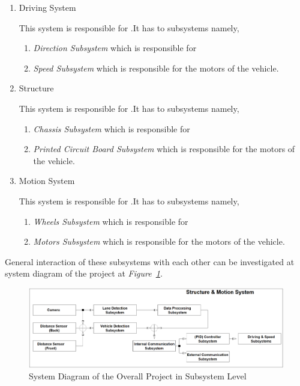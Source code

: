 \documentclass[a4paper,12pt]{article}
\begin{document}
\begin{enumerate}
		\item Driving System
		
		This system is responsible for .It has to subsystems namely,
			
			\begin{enumerate}
				\item \textit{Direction Subsystem} which is responsible for 									\item \textit{Speed Subsystem} which is responsible for the motors of the vehicle.
			\end{enumerate}
		
		\item Structure
		
		This system is responsible for .It has to subsystems namely,
			
			\begin{enumerate}
				\item \textit{Chassis Subsystem} which is responsible for 				
				\item \textit{Printed Circuit Board Subsystem} which is responsible for the motors of the vehicle.
			\end{enumerate}
		
		\item Motion System
		
		This system is responsible for .It has to subsystems namely,
			
			\begin{enumerate}
				\item \textit{Wheels Subsystem} which is responsible for 										\item \textit{Motors Subsystem} which is responsible for the motors of the vehicle.
			\end{enumerate}
	
	\end{enumerate}		
	
	General interaction of these subsystems with each other can be investigated at system diagram of the project at \textit{Figure~\ref{fig:system-diagram}}.
	
	\begin{figure}[H]
		\center
		\setlength{\unitlength}{\textwidth} 
		\includegraphics[width=1.0\textwidth]{system-diagram/system-diagram-3}
		\caption{\label{fig:system-diagram}System Diagram of the Overall Project in Subsystem Level}
	\end{figure}
	
\end{document}
